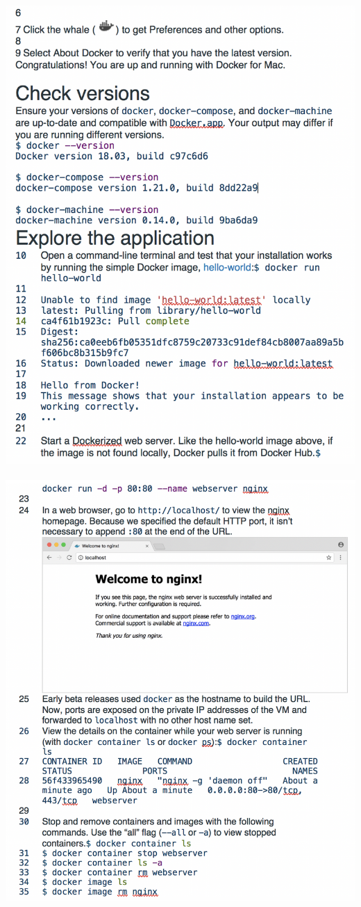 \includegraphics[width=\columnwidth]{images/install-docker3.png}

\includegraphics[width=\columnwidth]{images/install-docker4.png}







